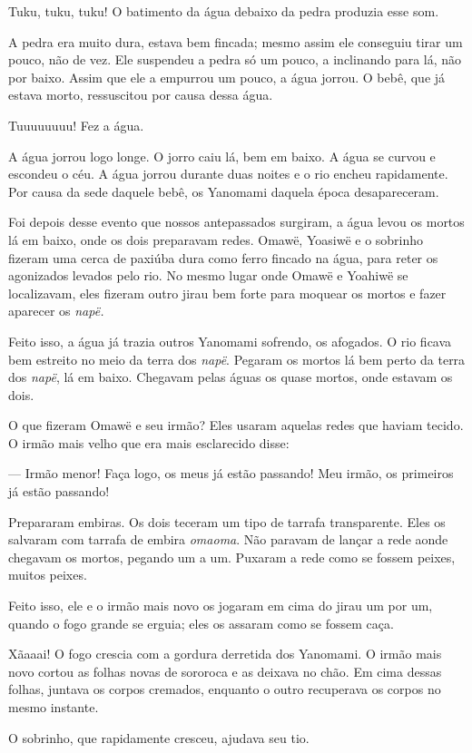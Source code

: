 Tuku, tuku, tuku! O batimento da água debaixo da pedra produzia esse
som. 

A pedra era muito dura, estava bem fincada; mesmo assim ele conseguiu
tirar um pouco, não de vez. Ele suspendeu a pedra só um pouco, a
inclinando para lá, não por baixo. Assim que ele a empurrou um pouco, a
água jorrou. O bebê, que já estava morto, ressuscitou por causa dessa
água.

Tuuuuuuuu! Fez a água. 

A água jorrou logo longe. O jorro caiu lá, bem em baixo. A água se
curvou e escondeu o céu. A água jorrou durante duas noites e o rio
encheu rapidamente. Por causa da sede daquele bebê, os Yanomami daquela
época desapareceram. 

Foi depois desse evento que nossos antepassados surgiram, a água levou
os mortos lá em baixo, onde os dois preparavam redes. Omawë, Yoasiwë e o
sobrinho fizeram uma cerca de paxiúba dura como ferro fincado na água,
para reter os agonizados levados pelo rio. No mesmo lugar onde Omawë e
Yoahiwë se localizavam, eles fizeram outro jirau bem forte para moquear
os mortos e fazer aparecer os \emph{napë.} 

Feito isso, a água já trazia outros Yanomami sofrendo, os afogados. O rio ficava bem estreito no meio da terra dos \emph{napë}. Pegaram os
mortos lá bem perto da terra dos \emph{napë}, lá em baixo. Chegavam
pelas águas os quase mortos, onde estavam os dois. 

O que fizeram Omawë e seu irmão? Eles usaram aquelas redes que haviam
tecido. O irmão mais velho que era mais esclarecido disse: 

--- Irmão menor! Faça logo, os meus já estão passando! Meu irmão, os
primeiros já estão passando! 

Prepararam embiras. Os dois teceram um tipo de tarrafa transparente.
Eles os salvaram com tarrafa de embira \emph{omaoma}. Não paravam de
lançar a rede aonde chegavam os mortos, pegando um a um. Puxaram a rede
como se fossem peixes, muitos peixes. 

Feito isso, ele e o irmão mais novo os jogaram em cima do jirau um por
um, quando o fogo grande se erguia; eles os assaram como se fossem
caça. 

Xãaaai! O fogo crescia com a gordura derretida dos Yanomami. O irmão
mais novo cortou as folhas novas de sororoca e as deixava no chão. Em
cima dessas folhas, juntava os corpos cremados, enquanto o outro
recuperava os corpos no mesmo instante. 

O sobrinho, que rapidamente cresceu, ajudava seu tio. 

